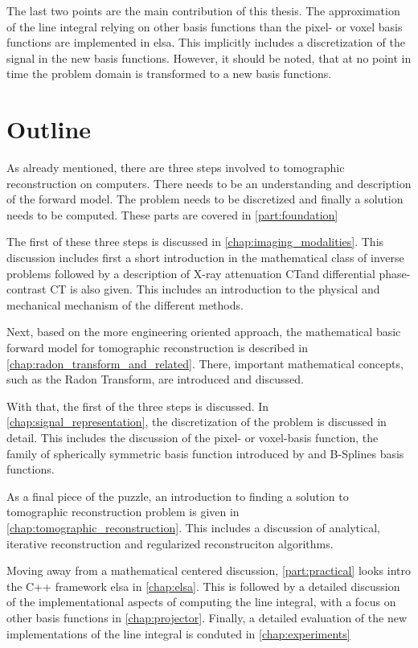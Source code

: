 The last two points are the main contribution of this thesis. The approximation of the line integral
relying on other basis functions than the pixel- or voxel basis functions are implemented in elsa.
This implicitly includes a discretization of the signal in the new basis functions. However, it
should be noted, that at no point in time the problem domain is transformed to a new basis
functions.

\section{Outline}\label{sec:outline}

As already mentioned, there are three steps involved to tomographic reconstruction on computers.
There needs to be an understanding and description of the forward model. The problem needs to be
discretized and finally a solution needs to be computed. These parts are covered in
\autoref{part:foundation}

The first of these three steps is discussed in \autoref{chap:imaging_modalities}. This discussion
includes first a short introduction in the mathematical class of inverse problems followed by a
description of X-ray attenuation CT\@ and differential phase-contrast CT is also given. This
includes an introduction to the physical and mechanical mechanism of the different methods.

Next, based on the more engineering oriented approach, the mathematical basic forward model for
tomographic reconstruction is described in \autoref{chap:radon_transform_and_related}. There,
important mathematical concepts, such as the Radon Transform, are introduced and discussed.

With that, the first of the three steps is discussed. In \autoref{chap:signal_representation}, the
discretization of the problem is discussed in detail. This includes the discussion of the pixel- or
voxel-basis function, the family of spherically symmetric basis function introduced by
\citeauthor*{lewitt_multidimensional_1990} and B-Splines basis functions.

As a final piece of the puzzle, an introduction to finding a solution to tomographic reconstruction
problem is given in \autoref{chap:tomographic_reconstruction}. This includes a discussion of
analytical, iterative reconstruction and regularized reconstruciton algorithms.

Moving away from a mathematical centered discussion, \autoref{part:practical} looks intro the C++
framework elsa in \autoref{chap:elsa}. This is followed by a detailed discussion of the
implementational aspects of computing the line integral, with a focus on other basis functions in
\autoref{chap:projector}. Finally, a detailed evaluation of the new implementations of the line
integral is conduted in \autoref{chap:experiments}

